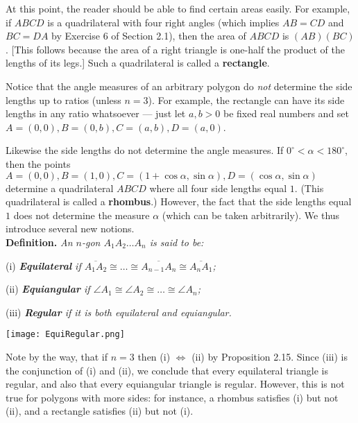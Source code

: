 \documentclass[leqno]{book}
\begin{document}
\noindent At this point, the reader should be able to find certain areas easily.  For example, if $ABCD$ is a quadrilateral with four right angles (which implies $AB=CD$ and $BC=DA$ by Exercise 6 of Section 2.1), then the area of $ABCD$ is $(AB)(BC)$.  [This follows because the area of a right triangle is one-half the product of the lengths of its legs.]  Such a quadrilateral is called a \textbf{rectangle}.

Notice that the angle measures of an arbitrary polygon do \emph{not} determine the side lengths up to ratios (unless $n=3$).  For example, the rectangle can have its side lengths in any ratio whatsoever \---- just let $a,b>0$ be fixed real numbers and set $A=(0,0),B=(0,b),C=(a,b),D=(a,0)$.

Likewise the side lengths do not determine the angle measures.  If $0^\circ<\alpha<180^\circ$, then the points $A=(0,0),B=(1,0),C=(1+\cos\alpha,\sin\alpha),D=(\cos\alpha,\sin\alpha)$ determine a quadrilateral $ABCD$ where all four side lengths equal $1$.  (This quadrilateral is called a \textbf{rhombus}.)  However, the fact that the side lengths equal $1$ does not determine the measure $\alpha$ (which can be taken arbitrarily).  We thus introduce several new notions.\\

\noindent\textbf{Definition.} \emph{An $n$-gon $A_1A_2\dots A_n$ is said to be:}

(i) \emph{\textbf{Equilateral} if $\overline{A_1A_2}\cong\dots\cong\overline{A_{n-1}A_n}\cong\overline{A_nA_1}$;}

(ii) \emph{\textbf{Equiangular} if $\angle A_1\cong\angle A_2\cong\dots\cong\angle A_n$;}

(iii) \emph{\textbf{Regular} if it is both equilateral and equiangular.}
\begin{center}\texttt{[image: EquiRegular.png]}\end{center}

\noindent Note by the way, that if $n=3$ then (i) $\iff$ (ii) by Proposition 2.15.  Since (iii) is the conjunction of (i) and (ii), we conclude that every equilateral triangle is regular, and also that every equiangular triangle is regular.  However, this is not true for polygons with more sides: for instance, a rhombus satisfies (i) but not (ii), and a rectangle satisfies (ii) but not (i).
\end{document}
